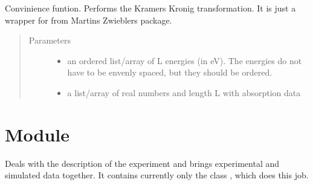 \documentclass[letterpaper,10pt,english]{sphinxmanual}
\begin{document}
\begin{fulllineitems}
\label{\detokenize{modules-api/samplerepresentation:SampleRepresentation.KramersKronig}}
Convinience funtion. Performs the Kramers Kronig transformation. It is just a wrapper for  from Martins Zwieblers  package.
\begin{quote}\begin{description}
\item[{Parameters}] \leavevmode\begin{itemize}
\item {} 
 \textendash{} an ordered list/array of L energies (in eV). The energies do not have to be envenly spaced, but they should be ordered.

\item {} 
 \textendash{} a list/array of real numbers and length L with absorption data

\end{itemize}

\end{description}\end{quote}

\end{fulllineitems}



\section{Module }
\label{\detokenize{modules-api/experiment:module-Experiment}}\label{\detokenize{modules-api/experiment:module-experiment}}\label{\detokenize{modules-api/experiment::doc}}
Deals with the description of the experiment and brings experimental and simulated data together.
It contains currently only the class {\hyperref[\detokenize{modules-api/experiment:Experiment.ReflDataSimulator}]{}}, which does this job.
\end{document}
